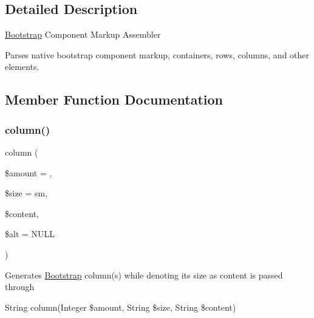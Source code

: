 \subsection{Detailed Description}
\hyperlink{class_w_a_f_f_l_e_1_1_framework_1_1_engines_1_1_bootstrap}{Bootstrap} Component Markup Assembler

Parses native bootstrap component markup, containers, rows, columns, and other elements. 

\subsection{Member Function Documentation}
\mbox{\label{class_w_a_f_f_l_e_1_1_framework_1_1_engines_1_1_bootstrap_a96d284570acb2b50b7e934af06d25c8e}} 
\subsubsection{\texorpdfstring{column()}{column()}}
{\footnotesize\ttfamily column (\begin{DoxyParamCaption}\item[{}]{\$amount = {},  }\item[{}]{\$size = {\ttfamily \textquotesingle{}sm\textquotesingle{}},  }\item[{}]{\$content,  }\item[{}]{\$alt = {\ttfamily NULL} }\end{DoxyParamCaption})}

Generates \hyperlink{class_w_a_f_f_l_e_1_1_framework_1_1_engines_1_1_bootstrap}{Bootstrap} column(s) while denoting its size as content is passed through

String column(Integer \$amount, String \$size, String \$content)


